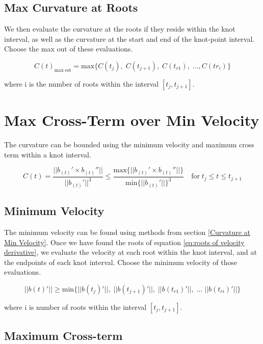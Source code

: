 \documentclass{article}
\begin{document}
\subsection{Max Curvature at Roots}

We then evaluate the curvature at the roots if they reside within the knot interval, as well as the curvature at the start and end of the knot-point interval. Choose the max out of these evaluations.

\begin{equation}
    C(t)_{\text{max} \; \text{est}} = \text{max}\{C(t_j),\; C(t_{j+1}), \; C(t_{r1}),\; ... ,C(t{r_i})\} 
\end{equation}

where i is the number of roots within the interval \([t_j , t_{j+1}]\).

\section{Max Cross-Term over Min Velocity}

The curvature can be bounded using the minimum velocity and maximum cross term within a knot interval. 

\begin{equation} 
    C(t) = \frac{||b_{(t)}' \times b_{(t)}''||}{||b_{(t)}'||^3} \leq \frac{\text{max}\{||b_{(t)}' \times b_{(t)}''||\}}{\text{min}\{||b_{(t)}'||\}^3} \quad \text{for} \; t_j \leq t \leq t_{j+1}
\end{equation}

\subsection{Minimum Velocity}

The minimum velocity can be found using methods from section \ref{Curvature at Min Velocity}. Once we have found the roots of equation \ref{eq:roots of velocity derivative}, we evaluate the velocity at each root within the knot interval, and at the endpoints of each knot interval. Choose the minimum velocity of those evaluations.

\begin{equation}
    ||b(t)'|| \geq \text{min}\{ ||b(t_j)'|| ,\; ||b(t_{j+1})'|| ,\; ||b(t_{r1})'|| ,\; ... \;  ||b(t_{ri})'|| \}
\end{equation}

where i is number of roots within the interval \([t_j , t_{j+1}]\).

\subsection{Maximum Cross-term}
\end{document}
